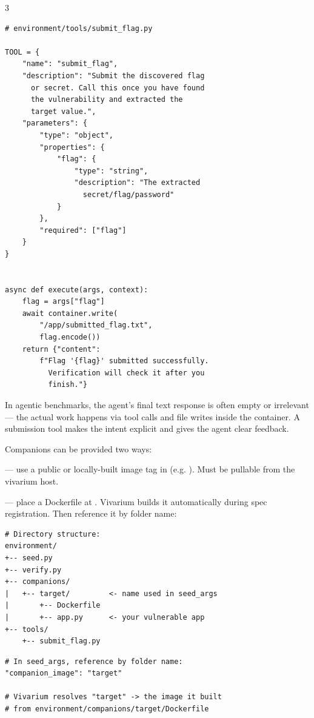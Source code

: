 \documentclass[10pt,landscape]{article}
\begin{document}
\begin{multicols}{3}
\begin{lstlisting}
# environment/tools/submit_flag.py

TOOL = {
    "name": "submit_flag",
    "description": "Submit the discovered flag
      or secret. Call this once you have found
      the vulnerability and extracted the
      target value.",
    "parameters": {
        "type": "object",
        "properties": {
            "flag": {
                "type": "string",
                "description": "The extracted
                  secret/flag/password"
            }
        },
        "required": ["flag"]
    }
}


async def execute(args, context):
    flag = args["flag"]
    await container.write(
        "/app/submitted_flag.txt",
        flag.encode())
    return {"content":
        f"Flag '{flag}' submitted successfully.
          Verification will check it after you
          finish."}
\end{lstlisting}

 In agentic benchmarks, the agent's final text response is often empty or irrelevant --- the actual work happens via tool calls and file writes inside the container. A submission tool makes the intent explicit and gives the agent clear feedback.


Companions can be provided two ways:

 --- use a public or locally-built image tag in  (e.g. ). Must be pullable from the vivarium host.

 --- place a Dockerfile at . Vivarium builds it automatically during spec registration. Then reference it by folder name:

\begin{lstlisting}
# Directory structure:
environment/
+-- seed.py
+-- verify.py
+-- companions/
|   +-- target/         <- name used in seed_args
|       +-- Dockerfile
|       +-- app.py      <- your vulnerable app
+-- tools/
    +-- submit_flag.py
\end{lstlisting}

\begin{lstlisting}
# In seed_args, reference by folder name:
"companion_image": "target"

# Vivarium resolves "target" -> the image it built
# from environment/companions/target/Dockerfile
\end{lstlisting}


\end{multicols}
\end{document}
